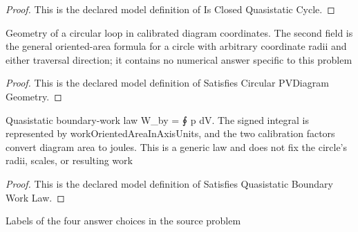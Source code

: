 \begin{proof}
  This is the declared model definition of Is Closed Quasistatic Cycle.
\end{proof}
\begin{definition}
  \label{def:physics:phyx-mini-0357:phyxminiproblems-problemphyxmini0357-satisfiescircularpvdiagramgeometry}
  Geometry of a circular loop in calibrated diagram coordinates. The second field is the general oriented-area formula for a circle with arbitrary coordinate radii and either traversal direction; it contains no numerical answer specific to this problem
\end{definition}
\begin{proof}
  This is the declared model definition of Satisfies Circular PVDiagram Geometry.
\end{proof}
\begin{definition}
  \label{def:physics:phyx-mini-0357:phyxminiproblems-problemphyxmini0357-satisfiesquasistaticboundaryworklaw}
  Quasistatic boundary-work law W\_by = ∮ p dV. The signed integral is represented by workOrientedAreaInAxisUnits, and the two calibration factors convert diagram area to joules. This is a generic law and does not fix the circle's radii, scales, or resulting work
\end{definition}
\begin{proof}
  This is the declared model definition of Satisfies Quasistatic Boundary Work Law.
\end{proof}
\begin{definition}
  \label{def:physics:phyx-mini-0357:phyxminiproblems-problemphyxmini0357-answerchoice}
  Labels of the four answer choices in the source problem
\end{definition}
